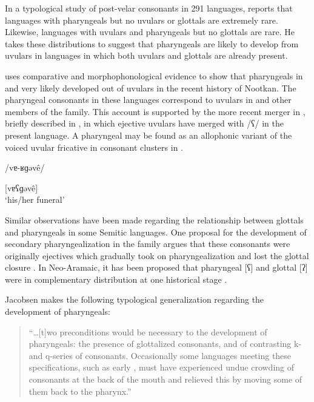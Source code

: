   In a typological study of post-velar consonants in 291 languages, \citet[49]{Sylak-Glassman2014} reports that languages with pharyngeals but no uvulars or glottals are extremely rare. Likewise, languages with uvulars and pharyngeals but no glottals are rare. He takes these distributions to suggest that pharyngeals are likely to develop from uvulars in languages in which both uvulars and glottals are already present.

  \citet{Jacobsen1969} uses comparative and morphophonological evidence to show that pharyngeals in  and  very likely developed out of uvulars in the recent history of Nootkan. The pharyngeal consonants in these languages correspond to uvulars in  and other members of the family. This account is supported by the more recent merger in , briefly described in , in which ejective uvulars have merged with /ʕ/ in the present language. A pharyngeal may be found as an allophonic variant of the voiced uvular fricative in consonant clusters in  .

\ea\label{ex:4.47}

/vɐ-ʁɡəvê/

[vɐʕɡəvê]\\
\glt ‘his/her funeral’
\citep[62]{Gong2018}
\z

  Similar observations have been made regarding the relationship between glottals and pharyngeals in some Semitic languages. One proposal for the development of secondary pharyngealization in the family argues that these consonants were originally ejectives which gradually took on pharyngealization and lost the glottal closure \citep{Zemánek1996}. In Neo-Aramaic, it has been proposed that pharyngeal [ʕ] and glottal [ʔ] were in complementary distribution at one historical stage \citep{Hoberman1985}.

  Jacobsen makes the following typological generalization regarding the development of pharyngeals:

\begin{quote}
“…[t]wo preconditions would be necessary to the development of pharyngeals: the presence of glottalized consonants, and of contrasting k- and q-series of consonants. Occasionally some languages meeting these specifications, such as early , must have experienced undue crowding of consonants at the back of the mouth and relieved this by moving some of them back to the pharynx.” 
\citep[152]{Jacobsen1969}
\end{quote}

